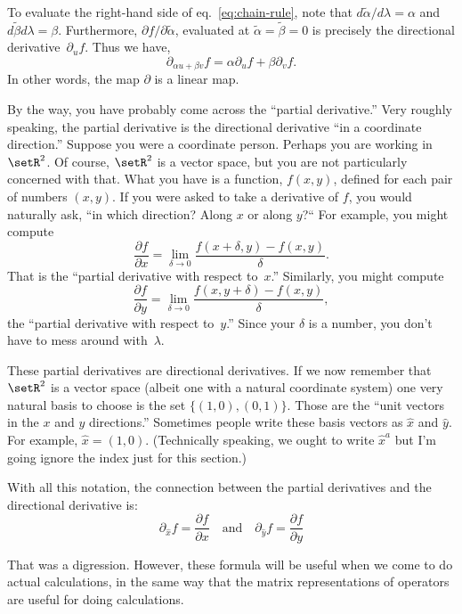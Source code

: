 \documentclass[10pt, a4paper]{article}
\begin{document}
To evaluate the right-hand side of eq.~\eqref{eq:chain-rule}, note
that $d\tilde{\alpha}/d\lambda = \alpha$ and
$d\tilde{\beta}d\lambda = \beta$. Furthermore,
$\partial f/\partial \tilde{\alpha}$, evaluated at
$\tilde{\alpha}=\tilde{\beta}=0$ is precisely the directional
derivative~$\partial_u f$. Thus we have,
\begin{equation*}
  \partial_{\alpha u+\beta v} f = \alpha\partial_u f + \beta\partial_v f.
\end{equation*}
In other words, the map $\partial$ is a linear map.











By the way, you have probably come across the “partial derivative.”
Very roughly speaking, the partial derivative is the directional
derivative “in a coordinate direction.” Suppose you were a coordinate
person. Perhaps you are working in $\setR^2$. Of course, $\setR^2$ is
a vector space, but you are not particularly concerned with that. What
you have is a function, $f(x,y)$, defined for each pair of numbers
$(x,y)$. If you were asked to take a derivative of $f$, you would
naturally ask, “in which direction? Along $x$ or along $y$?“ For
example, you might compute
\begin{equation*}
  \frac{\partial f}{\partial x} = \lim_{\delta\to 0} \frac{f(x + \delta, y) - f(x, y)}{\delta}.
\end{equation*}
That is the “partial derivative with respect to~$x$.” Similarly, you
might compute
\begin{equation*}
  \frac{\partial f}{\partial y} = \lim_{\delta\to 0} \frac{f(x, y+\delta) - f(x, y)}{\delta},
\end{equation*}
the “partial derivative with respect to~$y$.” Since your $\delta$ is a
number, you don't have to mess around with~$\lambda$.

These partial derivatives are directional derivatives. If we now
remember that $\setR^2$ is a vector space (albeit one with a natural
coordinate system) one very natural basis to choose is the set
$\{(1,0), (0,1)\}$. Those are the “unit vectors in the $x$ and $y$
directions.” Sometimes people write these basis vectors as $\hat{x}$
and $\hat{y}$. For example, $\hat{x} = (1,0)$. (Technically speaking,
we ought to write $\hat{x}^a$ but I'm going ignore the index just for
this section.)

With all this notation, the connection between the partial derivatives
and the directional derivative is:
\begin{equation*}
  \partial_{\hat{x}}f = \frac{\partial f}{\partial x} \quad\text{and}\quad 
  \partial_{\hat{y}}f = \frac{\partial f}{\partial y} 
\end{equation*}

That was a digression. However, these formula will be useful when we
come to do actual calculations, in the same way that the matrix
representations of operators are useful for doing calculations.
\end{document}
